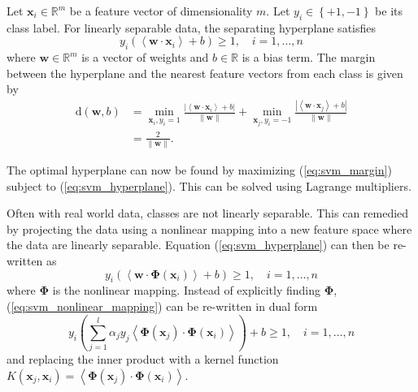 Let $\mathbf{x}_i \in \mathbb{R}^m$ be a feature vector of dimensionality $m$.
Let $y_i \in \left\{ +1, -1 \right\}$ be its class label. For linearly separable
data, the separating hyperplane satisfies
\begin{equation}\label{eq:svm_hyperplane}
y_i\left( \left< \mathbf{w} \cdot \mathbf{x}_i \right> + b \right) \ge 1, \hspace{1em}
i = 1,\ldots,n
\end{equation}
where $\mathbf{w} \in \mathbb{R}^m$ is a vector of weights and $b \in
\mathbb{R}$ is a bias term. The margin between the hyperplane and the nearest
feature vectors from each class is given by
\begin{align}
  \text{d}(\mathbf{w},b) &=
  \min_{\mathbf{x}_i,y_i=1}
  \frac{|\left< \mathbf{w} \cdot \mathbf{x}_i \right> + b|}{\|\mathbf{w}\|} +
  \min_{\mathbf{x}_j,y_i=-1}
  \frac{|\left< \mathbf{w} \cdot \mathbf{x}_j \right> + b|}{\|\mathbf{w}\|} \\[0.5em]
                         &= \frac{2}{\|\mathbf{w}\|}. \label{eq:svm_margin}
\end{align}

The optimal hyperplane can now be found by maximizing (\ref{eq:svm_margin})
subject to (\ref{eq:svm_hyperplane}). This can be solved using Lagrange
multipliers.

Often with real world data, classes are not linearly separable. This can
remedied by projecting the data using a nonlinear mapping into a new feature
space where the data are linearly separable. Equation (\ref{eq:svm_hyperplane})
can then be re-written as
\begin{equation}\label{eq:svm_nonlinear_mapping}
y_i\left( \left< \mathbf{w} \cdot \boldsymbol{\Phi}(\mathbf{x}_i) \right> + b \right) \ge 1, \hspace{1em}
i = 1,\ldots,n
\end{equation}
where $\boldsymbol{\Phi}$ is the nonlinear mapping. Instead of explicitly
finding $\boldsymbol{\Phi}$, (\ref{eq:svm_nonlinear_mapping}) can be re-written
in dual form
\begin{equation}
y_i\left(
  \sum_{j=1}^{l} \alpha_j y_j \left<
  \boldsymbol{\Phi}(\mathbf{x}_j) \cdot \boldsymbol{\Phi}(\mathbf{x}_i)
  \right>
\right) + b \ge 1, \hspace{1em} i=1,\ldots,n
\end{equation}
and replacing the inner product with a kernel function
$K(\mathbf{x}_j,\mathbf{x}_i) = \left< \boldsymbol{\Phi}(\mathbf{x}_j) \cdot
\boldsymbol{\Phi}(\mathbf{x}_i) \right>$.

